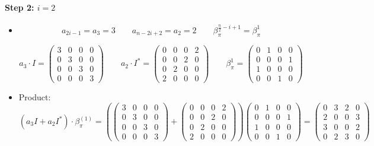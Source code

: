 \documentclass{article}
\begin{document}
\paragraph{Step 2: $i = 2$}

\begin{itemize}
    \item
    \[
        a_{2i - 1} = a_3 = 3 \qquad
        a_{n - 2i + 2} = a_2 = 2 \qquad
        \beta_\pi^{\frac{n}{2} - i + 1} = \beta_\pi^{1}
    \]

    \[
        a_3 \cdot I =
        \begin{pmatrix}
        3 & 0 & 0 & 0\\
        0 & 3 & 0 & 0\\
        0 & 0 & 3 & 0\\
        0 & 0 & 0 & 3
        \end{pmatrix}
        \qquad
        a_2 \cdot I^* =
        \begin{pmatrix}
        0 & 0 & 0 & 2\\
        0 & 0 & 2 & 0\\
        0 & 2 & 0 & 0\\
        2 & 0 & 0 & 0
        \end{pmatrix}
        \qquad
        \beta_\pi^{1} =
        \begin{pmatrix}
        0 & 1 & 0 & 0\\
        0 & 0 & 0 & 1\\
        1 & 0 & 0 & 0\\
        0 & 0 & 1 & 0
        \end{pmatrix}
    \]

    \item
    Product:
    \[
    (a_3 I + a_2 I^*) \cdot \beta_\pi^{(1)} =
    \left(
    \begin{pmatrix}
    3 & 0 & 0 & 0\\
    0 & 3 & 0 & 0\\
    0 & 0 & 3 & 0\\
    0 & 0 & 0 & 3
    \end{pmatrix}
    +
    \begin{pmatrix}
    0 & 0 & 0 & 2\\
    0 & 0 & 2 & 0\\
    0 & 2 & 0 & 0\\
    2 & 0 & 0 & 0
    \end{pmatrix}
    \right)
    \begin{pmatrix}
    0 & 1 & 0 & 0\\
    0 & 0 & 0 & 1\\
    1 & 0 & 0 & 0\\
    0 & 0 & 1 & 0
    \end{pmatrix}
    =
    \begin{pmatrix}
    0 & 3 & 2 & 0\\
    2 & 0 & 0 & 3\\
    3 & 0 & 0 & 2\\
    0 & 2 & 3 & 0
    \end{pmatrix}
    \]
\end{itemize}
\end{document}
